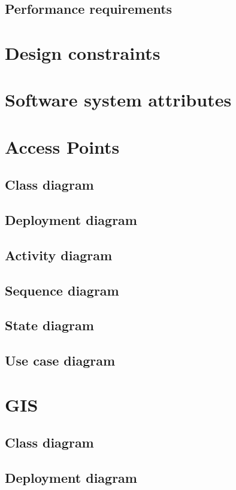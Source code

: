 \documentclass{article}
\begin{document}
	\subsection{Performance requirements}
\section{Design constraints}
\section{Software system attributes}


\clearpage
	\section{Access Points}

		\subsection{Class diagram}
		\subsection{Deployment diagram}
		\subsection{Activity diagram}
		\subsection{Sequence diagram}
		\subsection{State diagram}
		\subsection{Use case diagram}


	\clearpage
	
	\section{GIS}
		\subsection{Class diagram}
		\subsection{Deployment diagram}
\end{document}
